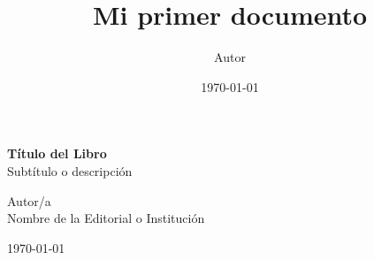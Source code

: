 \documentclass[12pt,a4paper]{book}
\title{Mi primer documento}
\author{Autor}
\date{\today}
\begin{document}
\begin{titlepage}
    \centering
    \vspace*{1cm}
    
    {\Huge \textbf{Título del Libro}} \\[0.5cm]
    {\Large Subtítulo o descripción}
    
    \vspace{2cm}
    
    \vfill
    
    {\Large Autor/a} \\[0.5cm]
    {\large Nombre de la Editorial o Institución}
    
    \vspace{1cm}
    {\large \today}
\end{titlepage}




\frontmatter %

\tableofcontents
\clearpage %

\mainmatter %




















\end{document}
